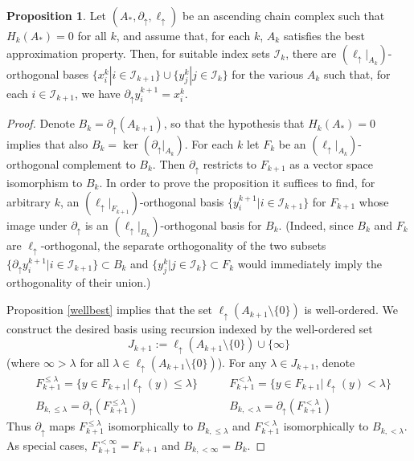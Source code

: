 \documentclass[11pt]{amsart}
\theoremstyle{definition}
\newtheorem{prop}[theorem]{Proposition}
\theoremstyle{remark}
\numberwithin{equation}{section}
\begin{document}
\begin{prop}\label{acyclic}
	Let $(A_*,\partial_{\uparrow},\ell_{\uparrow})$ be an ascending chain complex such that $H_k(A_*)=0$ for all $k$, and assume that, for each $k$, $A_k$ satisfies the best approximation property.  Then, for suitable index sets $\mathcal{I}_k$, there are $(\ell_{\uparrow}|_{A_k})$-orthogonal bases $\{x_i^k|i\in \mathcal{I}_{k+1}\}\cup \{y_j^k|j\in \mathcal{I}_{k}\}$ for the various $A_k$ such that, for each $i\in\mathcal{I}_{k+1}$, we have $\partial_{\uparrow} y_{i}^{k+1}=x_{i}^{k}$.
\end{prop}

\begin{proof}
	Denote $B_k=\partial_{\uparrow}(A_{k+1})$, so that the hypothesis that $H_k(A_*)=0$ implies that also $B_k=\ker(\partial_{\uparrow}|_{A_k})$.  For each $k$ let $F_k$ be an $(\ell_{\uparrow}|_{A_k})$-orthogonal complement to $B_k$.  Then $\partial_{\uparrow}$ restricts to $F_{k+1}$ as a vector space isomorphism to $B_k$.  In order to prove the proposition it suffices to find, for arbitrary $k$, an $(\ell_{\uparrow}|_{F_{k+1}})$-orthogonal basis $\{y_{i}^{k+1}|i\in\mathcal{I}_{k+1}\}$ for $F_{k+1}$ whose image under $\partial_{\uparrow}$ is an $(\ell_{\uparrow}|_{B_k})$-orthogonal basis for $B_k$.  (Indeed, since $B_k$ and $F_k$ are $\ell_{\uparrow}$-orthogonal, the separate orthogonality of the two subsets $\{\partial_{\uparrow} y_{i}^{k+1}|i\in\mathcal{I}_{k+1}\}\subset B_k$ and $\{y_{j}^{k}|j\in \mathcal{I}_k\}\subset F_k$ would immediately imply the orthogonality of their union.)
	
	Proposition \ref{wellbest} implies that the set $\ell_{\uparrow}(A_{k+1}\setminus\{0\})$ is well-ordered.  We construct the desired basis using recursion indexed by the well-ordered set \[ J_{k+1}:=\ell_{\uparrow}(A_{k+1}\setminus\{0\})\cup\{\infty\} \] (where $\infty>\lambda$ for all $\lambda\in \ell_{\uparrow}(A_{k+1}\setminus\{0\})$).  For any $\lambda\in J_{k+1}$, denote \begin{align*} & F_{k+1}^{\leq \lambda}= \{y\in F_{k+1}|\ell_{\uparrow}(y)\leq \lambda\}\qquad  & F_{k+1}^{< \lambda}= \{y\in F_{k+1}|\ell_{\uparrow}(y)< \lambda\} \\ 
		& B_{k,\leq\lambda} =\partial_{\uparrow}(F_{k+1}^{\leq \lambda})  & B_{k,<\lambda}=\partial_{\uparrow}(F_{k+1}^{<\lambda})  \end{align*}
	Thus $\partial_{\uparrow}$ maps $F_{k+1}^{\leq\lambda}$ isomorphically to $B_{k,\leq \lambda}$ and $F_{k+1}^{<\lambda}$ isomorphically to $B_{k,<\lambda}$.
	As special cases, $F_{k+1}^{<\infty}=F_{k+1}$ and $B_{k,<\infty}=B_k$.
	

\end{proof}
\end{document}
